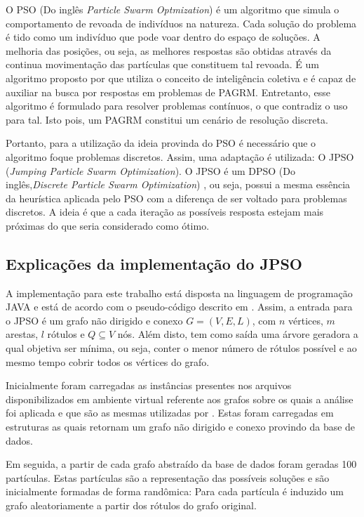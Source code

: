 \documentclass{sig-alternate-05-2015}
\begin{document}
O PSO (Do inglês \textit{Particle Swarm Optmization}) é um algoritmo que simula o comportamento de revoada de indivíduos na natureza. Cada solução do problema
é tido como um indivíduo que pode voar dentro do espaço de soluções. A melhoria das posições, ou seja, as melhores respostas são obtidas através da continua
movimentação das partículas que constituem tal revoada. É um algoritmo proposto por \cite{consoli2008discrete} que utiliza o conceito de inteligência coletiva
e é capaz de auxiliar na busca por respostas em problemas de PAGRM. Entretanto, esse algoritmo é formulado para resolver problemas contínuos, o que contradiz
o uso para tal. Isto pois, um PAGRM constitui um cenário de resolução discreta.


Portanto, para a utilização da ideia provinda do PSO  é necessário que o algoritmo foque problemas discretos. Assim, uma adaptação é utilizada: O JPSO (\textit{Jumping 
Particle Swarm Optimization}).
O JPSO  é um DPSO (Do inglês,\textit{Discrete Particle Swarm Optimization}) \cite{} , ou seja, possui 
a mesma essência da heurística aplicada pelo PSO com a diferença de ser voltado para problemas discretos. A ideia é que a cada iteração as possíveis resposta 
estejam mais próximas do que seria considerado como ótimo. 

\subsection{Explicações da implementação do JPSO}
A implementação para este trabalho está disposta na linguagem de programação JAVA  e está de acordo com o pseudo-código descrito em \cite{}. Assim, a entrada 
para o JPSO é um grafo não dirigido e conexo $G = (V,E,L)$, com $n$ vértices,         $m$ arestas, $l$ rótulos e $Q \subseteq V$ nós. Além disto, tem como 
saída uma árvore geradora a qual objetiva ser mínima, ou seja, conter o menor número de rótulos possível e ao mesmo tempo cobrir todos os vértices do grafo. 

Inicialmente foram carregadas as instâncias presentes nos arquivos disponibilizados em ambiente virtual referente aos grafos sobre os quais a análise foi aplicada 
e que são as  mesmas utilizadas por \cite{consoli2009greedy}. Estas foram carregadas em estruturas as quais retornam um grafo não dirigido e conexo provindo da 
base de dados. 
        
Em seguida, a partir de cada grafo abstraído da base de dados foram geradas 100 partículas. Estas partículas são a representação das possíveis soluções 
e são inicialmente formadas de forma randômica: Para cada partícula é induzido um grafo aleatoriamente a partir dos rótulos do grafo original.
\end{document}

